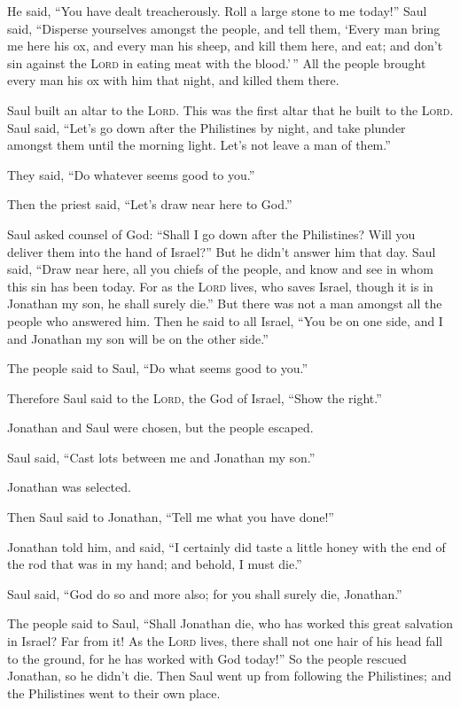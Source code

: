 He said, ``You have dealt treacherously. Roll a large stone to me
today!''  Saul said, ``Disperse yourselves amongst the
people, and tell them, `Every man bring me here his ox, and every man
his sheep, and kill them here, and eat; and don't sin against the
\textsc{Lord} in eating meat with the blood.'\,'' All the people brought
every man his ox with him that night, and killed them there.

 Saul built an altar to the \textsc{Lord}. This was the
first altar that he built to the \textsc{Lord}.  Saul
said, ``Let's go down after the Philistines by night, and take plunder
amongst them until the morning light. Let's not leave a man of them.''

They said, ``Do whatever seems good to you.''

Then the priest said, ``Let's draw near here to God.''

 Saul asked counsel of God: ``Shall I go down after the
Philistines? Will you deliver them into the hand of Israel?'' But he
didn't answer him that day.  Saul said, ``Draw near here,
all you chiefs of the people, and know and see in whom this sin has been
today.  For as the \textsc{Lord} lives, who saves Israel,
though it is in Jonathan my son, he shall surely die.'' But there was
not a man amongst all the people who answered him.  Then
he said to all Israel, ``You be on one side, and I and Jonathan my son
will be on the other side.''

The people said to Saul, ``Do what seems good to you.''

 Therefore Saul said to the \textsc{Lord}, the God of
Israel, ``Show the right.''

Jonathan and Saul were chosen, but the people escaped.

 Saul said, ``Cast lots between me and Jonathan my son.''

Jonathan was selected.

 Then Saul said to Jonathan, ``Tell me what you have
done!''

Jonathan told him, and said, ``I certainly did taste a little honey with
the end of the rod that was in my hand; and behold, I must die.''

 Saul said, ``God do so and more also; for you shall
surely die, Jonathan.''

 The people said to Saul, ``Shall Jonathan die, who has
worked this great salvation in Israel? Far from it! As the \textsc{Lord}
lives, there shall not one hair of his head fall to the ground, for he
has worked with God today!'' So the people rescued Jonathan, so he
didn't die.  Then Saul went up from following the
Philistines; and the Philistines went to their own place.

